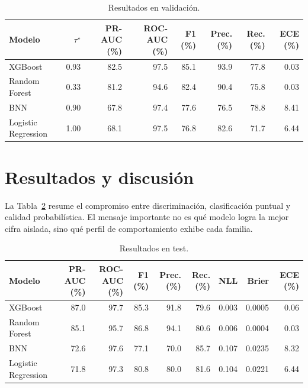 \documentclass{article}
\begin{document}
\begin{table}[!htbp]
    \centering
    \small
    \caption{Resultados en validación.}
    \label{tab:val_results}
    \begin{tabular}{lrrrrrrr}
        \toprule
        Modelo              & $\tau^\star$ & PR-AUC (\%) & ROC-AUC (\%) & F1 (\%) & Prec. (\%) & Rec. (\%) & ECE (\%) \\
        \midrule
        XGBoost             & 0.93         & 82.5        & 97.5         & 85.1    & 93.9       & 77.8      & 0.03     \\
        Random Forest       & 0.33         & 81.2        & 94.6         & 82.4    & 90.4       & 75.8      & 0.03     \\
        BNN                 & 0.90         & 67.8        & 97.4         & 77.6    & 76.5       & 78.8      & 8.41     \\
        Logistic Regression & 1.00         & 68.1        & 97.5         & 76.8    & 82.6       & 71.7      & 6.44     \\
        \bottomrule
    \end{tabular}
\end{table}

\FloatBarrier

\section{Resultados y discusión}

La Tabla~\ref{tab:test_results} resume el compromiso entre discriminación, clasificación puntual y calidad probabilística. El mensaje importante no es qué modelo logra la mejor cifra aislada, sino qué perfil de comportamiento exhibe cada familia.

\begin{table}[!htbp]
    \centering
    \small
    \caption{Resultados en test.}
    \label{tab:test_results}
    \begin{tabular}{lrrrrrrrr}
        \toprule
        Modelo              & PR-AUC (\%) & ROC-AUC (\%) & F1 (\%) & Prec. (\%) & Rec. (\%) & NLL   & Brier  & ECE (\%) \\
        \midrule
        XGBoost             & 87.0        & 97.7         & 85.3    & 91.8       & 79.6      & 0.003 & 0.0005 & 0.06     \\
        Random Forest       & 85.1        & 95.7         & 86.8    & 94.1       & 80.6      & 0.006 & 0.0004 & 0.03     \\
        BNN                 & 72.6        & 97.6         & 77.1    & 70.0       & 85.7      & 0.107 & 0.0235 & 8.32     \\
        Logistic Regression & 71.8        & 97.3         & 80.8    & 80.0       & 81.6      & 0.104 & 0.0221 & 6.44     \\
        \bottomrule
    \end{tabular}
\end{table}
\end{document}
